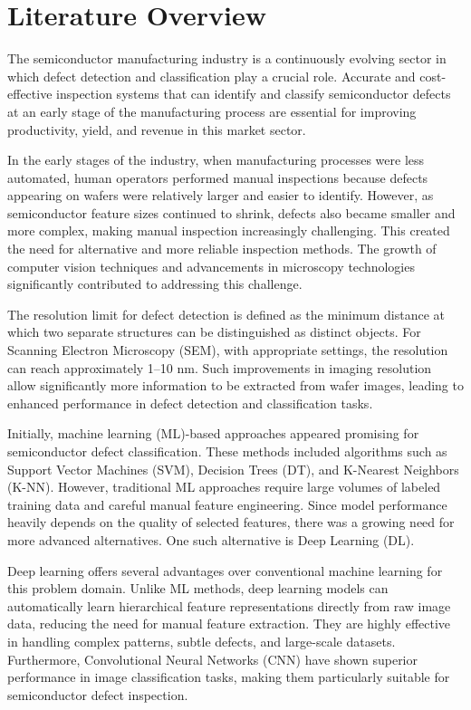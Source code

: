 \chapter{Literature Overview}

The semiconductor manufacturing industry is a continuously evolving sector in which defect detection and classification play a crucial role. Accurate and cost-effective inspection systems that can identify and classify semiconductor defects at an early stage of the manufacturing process are essential for improving productivity, yield, and revenue in this market sector.

In the early stages of the industry, when manufacturing processes were less automated, human operators performed manual inspections because defects appearing on wafers were relatively larger and easier to identify. However, as semiconductor feature sizes continued to shrink, defects also became smaller and more complex, making manual inspection increasingly challenging. This created the need for alternative and more reliable inspection methods. The growth of computer vision techniques and advancements in microscopy technologies significantly contributed to addressing this challenge.

The resolution limit for defect detection is defined as the minimum distance at which two separate structures can be distinguished as distinct objects. For Scanning Electron Microscopy (SEM), with appropriate settings, the resolution can reach approximately 1–10 nm. Such improvements in imaging resolution allow significantly more information to be extracted from wafer images, leading to enhanced performance in defect detection and classification tasks.

Initially, machine learning (ML)-based approaches appeared promising for semiconductor defect classification. These methods included algorithms such as Support Vector Machines (SVM), Decision Trees (DT), and K-Nearest Neighbors (K-NN). However, traditional ML approaches require large volumes of labeled training data and careful manual feature engineering. Since model performance heavily depends on the quality of selected features, there was a growing need for more advanced alternatives. One such alternative is Deep Learning (DL).

Deep learning offers several advantages over conventional machine learning for this problem domain. Unlike ML methods, deep learning models can automatically learn hierarchical feature representations directly from raw image data, reducing the need for manual feature extraction. They are highly effective in handling complex patterns, subtle defects, and large-scale datasets. Furthermore, Convolutional Neural Networks (CNN) have shown superior performance in image classification tasks, making them particularly suitable for semiconductor defect inspection.

